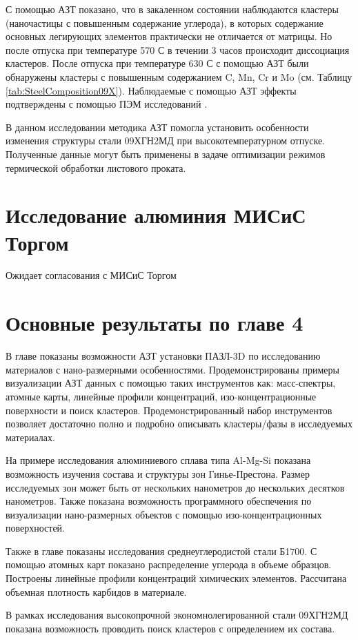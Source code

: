 \FloatBarrier
С помощью АЗТ показано, что в закаленном состоянии наблюдаются кластеры (наночастицы с повышенным содержание углерода), в которых содержание основных легирующих элементов практически не отличается от матрицы. Но после отпуска при температуре 570 \textdegree С в течении 3 часов происходит диссоциация кластеров. После отпуска при температуре 630 \textdegree С с помощью АЗТ были обнаружены кластеры с повышенным содержанием C, Mn, Cr и Mo (см. Таблицу \cref{tab:SteelComposition09X}). Наблюдаемые с помощью АЗТ эффекты подтверждены с помощью ПЭМ исследований \cite{scbibGlubev}.

В данном исследовании методика АЗТ помогла установить особенности изменения структуры стали 09ХГН2МД при высокотемпературном отпуске. Полученные данные могут быть применены в задаче оптимизации режимов термической обработки листового проката.

\FloatBarrier

\section{Исследование алюминия МИСиС Торгом}\label{sec:ch4/sect4}

Ожидает согласования с МИСиС Торгом

\FloatBarrier
\clearpage
\section{Основные результаты по главе 4}\label{sec:ch4/sect5}


В главе показаны возможности АЗТ установки ПАЗЛ-3D по исследованию материалов с нано-размерными особенностями. Продемонстрированы примеры визуализации АЗТ данных с помощью таких инструментов как: масс-спектры, атомные карты, линейные профили концентраций, изо-концентрационные поверхности и поиск кластеров. Продемонстрированный набор инструментов позволяет достаточно полно и подробно описывать кластеры/фазы в исследуемых материалах.

На примере исследования алюминиевого сплава типа Al-Mg-Si показана возможность изучения состава и структуры зон Гинье-Престона. Размер исследуемых зон может быть от нескольких нанометров до нескольких десятков нанометров. Также показана возможность программного обеспечения по визуализации нано-размерных объектов с помощью изо-концентрационных поверхностей.

Также в главе показаны исследования среднеуглеродистой стали Б1700. С помощью атомных карт показано распределение углерода в объеме образцов. Построены линейные профили концентраций химических элементов. Рассчитана объемная плотность карбидов в материале.


В рамках исследования высокопрочной экономнолегированной стали 09ХГН2МД показана возможность проводить поиск кластеров с определением их состава.




\FloatBarrier
\clearpage


















